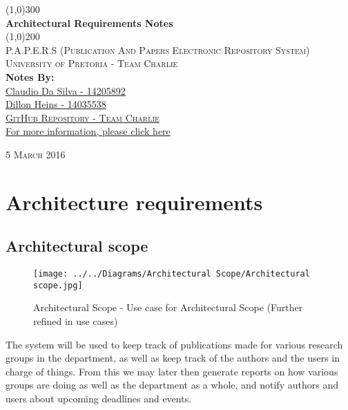 \documentclass{article}
\begin{document}
	
	\begin{titlepage}
		\begin{center}
			
			\line(1,0){300}\\
			[6mm]
			\huge{
				\bfseries Architectural Requirements Notes
			}\\
			[2mm]
			\line(1,0){200}\\
			[15mm]
			\textsc{\large P.A.P.E.R.S (Publication And Papers Electronic Repository System)}\\
			[7.5mm]
			\textsc{\large University of Pretoria - Team Charlie}\\
			[20mm]
			\large{\textbf{Notes By:}}\\
			[2mm]
			\large{
				\href{https://github.com/ClaudioMDS}{Claudio Da Silva - 14205892}\\
				\href{https://github.com/DillonHeins}{Dillon Heins - 14035538}
			}\\
			[4cm]
			
			\href{https://github.com/DillonHeins/Charlie}{\textsc{\Large GitHub Repository - Team Charlie}\\[2mm]
				For more information, please click here}
			
		\end{center}	
		\begin{flushright}
			\textsc{\large 5 March 2016}
		\end{flushright}
	\end{titlepage}
	
	\cleardoublepage
	\thispagestyle{empty}
	\tableofcontents
	\cleardoublepage
	\setcounter{page}{1}
	\section{Architecture requirements}\label{sec:requirements}
	
	\subsection{Architectural scope}\label{subsec:scope}
	
	\begin{figure}[H]
		\texttt{[image: ../../Diagrams/Architectural Scope/Architectural scope.jpg]}
		\caption{Architectural Scope - Use case for Architectural Scope (Further refined in use cases)}
	\end{figure}
	
	\par The system will be used to keep track of publications made for various research groups in the department, as well as keep track of the authors and the users in charge of things. From this we may later then generate reports on how various groups are doing as well as the department as a whole, and notify authors and users about upcoming deadlines and events.\\
	
\end{document}
